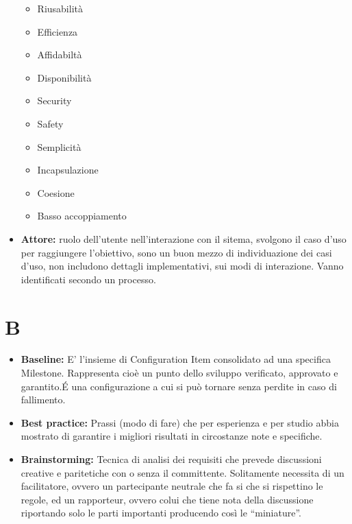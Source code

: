\documentclass[a4paper]{article}
\begin{document}
\begin{itemize}
\begin{itemize}
				\item  Riusabilità
				\item  Efficienza
				\item  Affidabiltà
				\item  Disponibilità
				\item  Security
				\item  Safety
				\item  Semplicità
				\item  Incapsulazione
				\item  Coesione
				\item  Basso accoppiamento
			\end{itemize}
			\item \textbf{Attore:}  ruolo dell'utente nell'interazione con il sitema, svolgono il caso d'uso per raggiungere l'obiettivo, 
			sono un buon mezzo di individuazione dei casi d'uso, non includono dettagli implementativi, sui modi di interazione. Vanno 
			identificati secondo un processo.
		\end{itemize}
		
	\section{B}
		\begin{itemize}
			\item \textbf{Baseline:} E' l'insieme di Configuration Item consolidato ad una specifica Milestone. Rappresenta 
			cioè un punto dello sviluppo verificato, approvato e garantito.\'E una configurazione a cui si può tornare senza perdite
			 in caso di fallimento.
			\item \textbf{Best practice:} Prassi (modo di fare) che per esperienza e per studio abbia mostrato di 
			garantire i migliori risultati in circostanze note e specifiche. 
			\item \textbf{Brainstorming:} Tecnica di analisi dei requisiti che prevede discussioni creative e paritetiche 
			con o senza il committente. Solitamente necessita di un facilitatore, ovvero un partecipante neutrale che fa 
			si che si rispettino le regole, ed un rapporteur, ovvero colui che tiene nota della discussione riportando solo 
			le parti importanti producendo così le “miniature”.
		\end{itemize}
		
\end{document}
